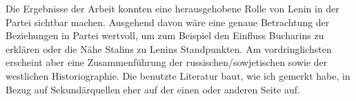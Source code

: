 \documentclass{../../sem_paper}
\begin{document}
Die Ergebnisse der Arbeit konnten eine herausgehobene Rolle von Lenin in der Partei sichtbar machen. Ausgehend davon wäre eine genaue Betrachtung der Beziehungen in Partei wertvoll, um zum Beispiel den Einfluss Bucharins zu erklären oder die Nähe Stalins zu Lenins Standpunkten.
Am vordringlichsten erscheint aber eine Zusammenführung der russischen/sowjetischen sowie der westlichen Historiographie. Die benutzte Literatur baut, wie ich gemerkt habe, in Bezug auf Sekundärquellen eher auf der einen oder anderen Seite auf. 


\literature
\end{document}
